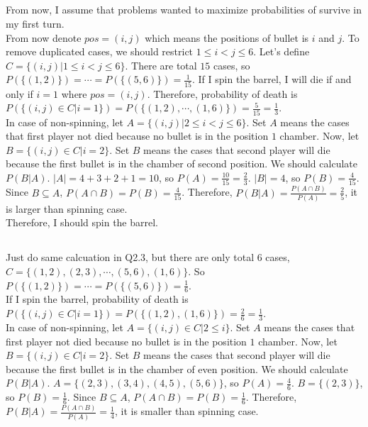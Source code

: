 \documentclass{article}
\begin{document}
\subsection{}
From now, I assume that problems wanted to maximize probabilities of survive in my first turn. \\

From now denote $pos=(i,j)$ which means the positions of bullet is $i$ and $j$.
To remove duplicated cases, we should restrict $1 \leq i < j \leq 6$.
Let's define $C=\{(i,j) | 1 \leq i < j \leq 6\}$.
There are total $15$ cases, so $P(\{(1,2)\}) = \cdots = P(\{(5,6)\}) = \frac{1}{15}$.
If I spin the barrel, I will die if and only if $i=1$ where $pos=(i,j)$.
Therefore, probability of death is
$P(\{(i,j) \in C | i=1\})
= P(\{(1,2), \cdots, (1,6)\})
= \frac{5}{15} = \frac{1}{3}$. \\

In case of non-spinning, let $A=\{(i,j) | 2 \leq i < j \leq 6\}$.
Set $A$ means the cases that first player not died
    because no bullet is in the position $1$ chamber.
Now, let $B=\{(i,j) \in C | i=2\}$.
Set $B$ means the cases that second player will die
    because the first bullet is in the chamber of second position.
We should calculate $P(B|A)$.
$|A|=4+3+2+1=10$, so $P(A) = \frac{10}{15} = \frac{2}{3}$.
$|B|=4$, so $P(B) = \frac{4}{15}$.
Since $B \subseteq A$, $P(A \cap B) = P(B) = \frac{4}{15}$.
Therefore, $P(B|A) = \frac{P(A \cap B)}{P(A)} = \frac{2}{5}$,
    it is larger than spinning case. \\

Therefore, I should spin the barrel.

\subsection{}
Just do same calcuation in Q2.3, but there are only total 6 cases,
$C = \{(1,2), (2,3), \cdots, (5,6), (1,6)\}$.
So $P(\{(1,2)\}) = \cdots = P(\{(5,6)\}) = \frac{1}{6}$. \\

If I spin the barrel, probability of death is
$P(\{(i,j) \in C | i=1\})
= P(\{(1,2),(1,6)\})
= \frac{2}{6} = \frac{1}{3}$. \\

In case of non-spinning, let $A=\{(i,j) \in C | 2 \leq i\}$.
Set $A$ means the cases that first player not died
    because no bullet is in the position $1$ chamber.
Now, let $B=\{(i,j) \in C | i=2\}$.
Set $B$ means the cases that second player will die
    because the first bullet is in the chamber of even position.
We should calculate $P(B|A)$.
$A=\{(2,3),(3,4),(4,5),(5,6)\}$, so $P(A)=\frac{4}{6}$.
$B=\{(2,3)\}$, so $P(B)=\frac{1}{6}$.
Since $B \subseteq A$, $P(A \cap B) = P(B) = \frac{1}{6}$.
Therefore, $P(B|A) = \frac{P(A \cap B)}{P(A)} = \frac{1}{4}$,
    it is smaller than spinning case. \\
\end{document}
